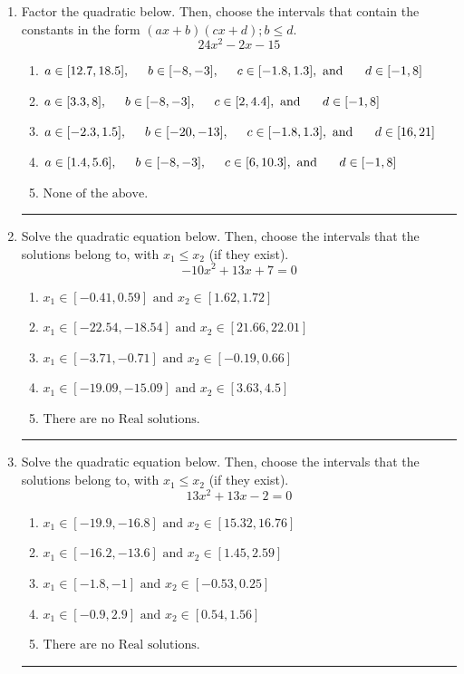 \documentclass[14pt]{extbook}
\newcommand{\litem}[1]{\item#1\hspace*{-1cm}\rule{\textwidth}{0.4pt}}
\begin{document}
\begin{enumerate}
{\begin{enumerate}[label=\Alph*.]
\end{enumerate} }
\litem{
Factor the quadratic below. Then, choose the intervals that contain the constants in the form $(ax+b)(cx+d); b \leq d.$\[ 24x^{2} -2 x -15 \]\begin{enumerate}[label=\Alph*.]
\item \( a \in [12.7, 18.5], \hspace*{5mm} b \in [-8, -3], \hspace*{5mm} c \in [-1.8, 1.3], \text{ and } \hspace*{5mm} d \in [-1, 8] \)
\item \( a \in [3.3, 8], \hspace*{5mm} b \in [-8, -3], \hspace*{5mm} c \in [2, 4.4], \text{ and } \hspace*{5mm} d \in [-1, 8] \)
\item \( a \in [-2.3, 1.5], \hspace*{5mm} b \in [-20, -13], \hspace*{5mm} c \in [-1.8, 1.3], \text{ and } \hspace*{5mm} d \in [16, 21] \)
\item \( a \in [1.4, 5.6], \hspace*{5mm} b \in [-8, -3], \hspace*{5mm} c \in [6, 10.3], \text{ and } \hspace*{5mm} d \in [-1, 8] \)
\item \( \text{None of the above.} \)

\end{enumerate} }
\litem{
Solve the quadratic equation below. Then, choose the intervals that the solutions belong to, with $x_1 \leq x_2$ (if they exist).\[ -10x^{2} +13 x + 7 = 0 \]\begin{enumerate}[label=\Alph*.]
\item \( x_1 \in [-0.41, 0.59] \text{ and } x_2 \in [1.62, 1.72] \)
\item \( x_1 \in [-22.54, -18.54] \text{ and } x_2 \in [21.66, 22.01] \)
\item \( x_1 \in [-3.71, -0.71] \text{ and } x_2 \in [-0.19, 0.66] \)
\item \( x_1 \in [-19.09, -15.09] \text{ and } x_2 \in [3.63, 4.5] \)
\item \( \text{There are no Real solutions.} \)

\end{enumerate} }
\litem{
Solve the quadratic equation below. Then, choose the intervals that the solutions belong to, with $x_1 \leq x_2$ (if they exist).\[ 13x^{2} +13 x -2 = 0 \]\begin{enumerate}[label=\Alph*.]
\item \( x_1 \in [-19.9, -16.8] \text{ and } x_2 \in [15.32, 16.76] \)
\item \( x_1 \in [-16.2, -13.6] \text{ and } x_2 \in [1.45, 2.59] \)
\item \( x_1 \in [-1.8, -1] \text{ and } x_2 \in [-0.53, 0.25] \)
\item \( x_1 \in [-0.9, 2.9] \text{ and } x_2 \in [0.54, 1.56] \)
\item \( \text{There are no Real solutions.} \)


\end{enumerate}}
\end{enumerate}
\end{document}
